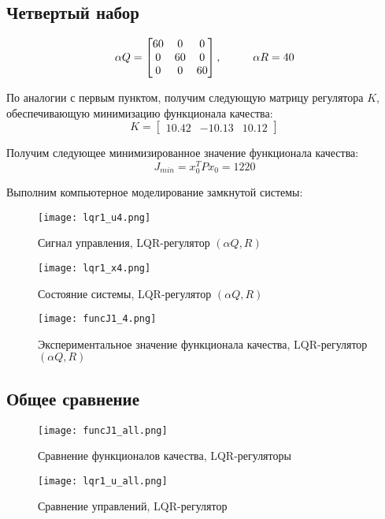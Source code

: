 \newpage
\subsection{Четвертый набор}
$$
  \alpha Q = \begin{bmatrix}
                      60 & 0 & 0 \\
                      0 & 60 & 0 \\
                      0 & 0 & 60 
                      \end{bmatrix}, \hspace*{1cm} \alpha R=40
$$

По аналогии с первым пунктом, получим следующую матрицу регулятора $K$, обеспечивающую минимизацию функционала качества:
$$
   K = \begin{bmatrix} 10.42 & -10.13 &  10.12 \end{bmatrix}
$$

Получим следующее минимизированное значение функционала качества:
$$
   J_{min} = x_0^T P x_0 = 1220
$$

Выполним компьютерное моделирование замкнутой системы:

\begin{figure}[ht]
  \centering
  \texttt{[image: lqr1\_u4.png]}
  \caption{Сигнал управления, LQR-регулятор $( \alpha Q, R)$}
\end{figure}
\newpage
\begin{figure}[ht]
  \centering
  \texttt{[image: lqr1\_x4.png]}
  \caption{Состояние системы, LQR-регулятор $(\alpha Q, R)$}
\end{figure}
\begin{figure}[ht]
  \centering
  \texttt{[image: funcJ1\_4.png]}
  \caption{Экспериментальное значение функционала качества, LQR-регулятор $(\alpha Q, R)$}
\end{figure}

\newpage
\subsection{Общее сравнение}

\begin{figure}[ht]
  \centering
  \texttt{[image: funcJ1\_all.png]}
  \caption{Сравнение функционалов качества, LQR-регуляторы}
\end{figure}
\begin{figure}[ht]
  \centering
  \texttt{[image: lqr1\_u\_all.png]}
  \caption{Сравнение управлений, LQR-регулятор}
\end{figure}

